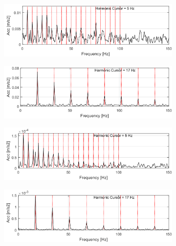 \begin{figure}[!ht]
    \centering
    \begin{subfigure}[b]{0.49\textwidth}
        \centering
        \captionsetup{skip=0.01pt}
        \caption{}
        \includegraphics[width=\textwidth]{wykresy/chapter_application/semi_blind/widmo_obwiedni_simulated_comp5.png}
    \end{subfigure}
    \begin{subfigure}[b]{0.49\textwidth}
        \centering
        \captionsetup{skip=0.01pt}
        \caption{}
    \includegraphics[width=\textwidth]{wykresy/chapter_application/semi_blind/widmo_obwiedni_simulated_comp17.png}
    \end{subfigure}
    \begin{subfigure}[b]{0.49\textwidth}
        \centering
        \captionsetup{skip=0.01pt}
        \caption{}
        \includegraphics[width=\textwidth]{wykresy/chapter_application/semi_blind/widmo_obwiedni_simulated_5.png}
    \end{subfigure}
    \begin{subfigure}[b]{0.49\textwidth}
        \centering
        \captionsetup{skip=0.01pt}
        \caption{}
        \includegraphics[width=\textwidth]{wykresy/chapter_application/semi_blind/widmo_obwiedni_simulated_17.png}
        

\end{subfigure}
\end{figure}
